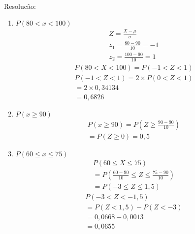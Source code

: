 \begin{description}
\begin{description}
    \item {Resolucão:}
      \begin{enumerate}[label=(\alph*)]
        \item $P(80 < x < 100)$
          \begin{align*}
            Z= \frac{X-\mu  }{\sigma} \\
            z_1 = \frac{80-90}{10}=-1\\
            z_2 = \frac{100-90}{10}=1
          \end{align*}
         \begin{align*}
           P(80<X < 100) = P(-1 < Z <1)
         \end{align*} 
         \begin{align*}
           P(-1 < Z < 1)  = 2 \times P(0<Z < 1) \\
           = 2 \times 0,34134 \\
           =0,6826
         \end{align*}

        \item $P(x \geq  90)$
          \begin{align*}
            P(x \geq 90) =P(Z \geq \frac{90-90}{10}) \\
            = P(Z \geq 0)=0,5
          \end{align*}

        \item $P(60 \leq x \leq 75 )$
          \begin{align*}
            P(60 \leq X \leq 75 ) \\
            =P(\frac{60-90}{10} \leq Z \leq \frac{75-90}{10}) \\
            =P(-3 \leq Z \leq 1,5)
          \end{align*}
          \begin{align*}
            P(-3 < Z < -1,5)\\
            =P(Z <1,5)- P(Z< -3) \\
            =0,0668- 0,0013 \\
            =0,0655
          \end{align*}


\end{enumerate}
\end{description}
\end{description}
